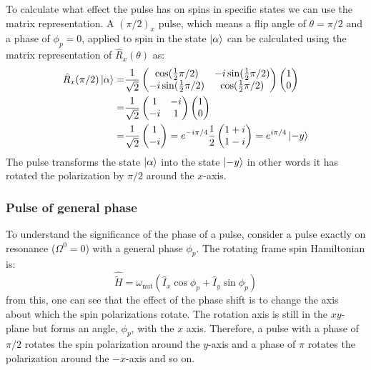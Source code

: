 To calculate what effect the pulse has on spins in specific states we can use the matrix representation.
A $(\pi/2)_x$ pulse, which means a flip angle of $\theta = \pi/2$ and a phase of $\phi_p = 0$, applied to spin in the state $\ket{\alpha}$ can be calculated using the matrix representation of $\hat{R}_x(\theta)$  as:
\begin{align}
  \hat{R}_x(\pi/2)\ket{\alpha} =& \frac{1}{\sqrt{2}}\begin{pmatrix}
     \cos(\frac{1}{2}\pi/2) & -i\sin(\frac{1}{2}\pi/2)\\
     -i\sin(\frac{1}{2}\pi/2) & \cos(\frac{1}{2}\pi/2)
\end{pmatrix}\begin{pmatrix}
  1\\
  0
\end{pmatrix}\\ =& \frac{1}{\sqrt{2}}\begin{pmatrix}
  1 & -i\\
  -i & 1
\end{pmatrix}\begin{pmatrix}
  1\\
  0
\end{pmatrix}\\ =& \frac{1}{\sqrt{2}}\begin{pmatrix}
  1\\
  -i
\end{pmatrix} = e^{-i\pi/4}\frac{1}{2}\begin{pmatrix}
  1+i\\
  1-i
\end{pmatrix} = e^{i\pi/4}\ket{-y}
\end{align}
The pulse transforms the state $\ket{\alpha}$ into the state $\ket{-y}$ in other words
it has rotated the polarization by $\pi/2$ around the $x$-axis.


\subsubsection{Pulse of general phase}

To understand the significance of the phase of a pulse, consider a pulse exactly on resonance
($\Omega^0 = 0$) with a general phase $\phi_p$. The rotating frame spin Hamiltonian is:
\begin{equation}
  \hat{\tilde{H}} = \omega_{\text{nut}}(\hat{I}_x\cos\phi_p + \hat{I}_y\sin\phi_p)
\end{equation}
from this, one can see that the effect of the phase shift is to change the axis about
which the spin polarizations rotate. The rotation axis is still in the $xy$-plane but forms
an angle, $\phi_p$, with the $x$ axis. Therefore, a pulse with a phase of $\pi/2$ rotates the spin
polarization around the $y$-axis and a phase of $\pi$ rotates the polarization around the $-x$-axis and
so on.

